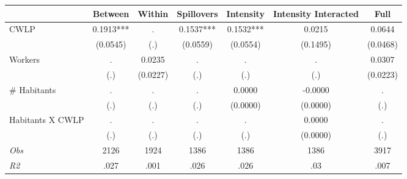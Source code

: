 \begin{tabular}{l*{6}{c}}\hline&\multicolumn{1}{c}{Between}&\multicolumn{1}{c}{Within}&\multicolumn{1}{c}{Spillovers}&\multicolumn{1}{c}{Intensity}&\multicolumn{1}{c}{Intensity Interacted}&\multicolumn{1}{c}{Full}\\ \hline 
CWLP & 0.1913*** & . & 0.1537*** & 0.1532*** & 0.0215 & 0.0644 \\
 & (0.0545) & (.) & (0.0559) & (0.0554) & (0.1495) & (0.0468) \\
Workers & . & 0.0235 & . & . & . & 0.0307 \\
 & (.) & (0.0227) & (.) & (.) & (.) & (0.0223) \\
\# Habitants & . & . & . & 0.0000 & -0.0000 & . \\
 & (.) & (.) & (.) & (0.0000) & (0.0000) & (.) \\
Habitants X CWLP & . & . & . & . & 0.0000 & . \\
 & (.) & (.) & (.) & (.) & (0.0000) & (.) \\
\hline \textit{Obs} & 2126 & 1924 & 1386 & 1386 & 1386 & 3917 \\ \textit{R2} & .027 & .001 & .026 & .026 & .03 & .007 \\ \hline \end{tabular}
